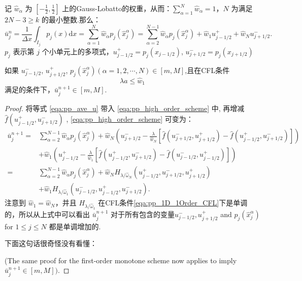 \documentclass{book}
\begin{document}
记 $\hat{w}_{\alpha}$ 为 $\left[-\frac{1}{2}, \frac{1}{2}\right]$ 上的Gauss-Lobatto的权重，从而：$\sum_{\alpha=1}^{N} \hat{w}_{\alpha}=1$，$N$ 为满足 $2 N-3 \geqslant k$ 的最小整数.那么：
\begin{equation}
    \label{eqa:pp_ave_u}
    \bar{u}_{j}^{n}=\frac{1}{\Delta x} \int_{I_{j}} p_{j}(x) \mathrm{d} x=\sum_{\alpha=1}^{N} \hat{w}_{\alpha} p_{j}\left(\hat{x}_{j}^{\alpha}\right)=\sum_{\alpha=2}^{N-1} \hat{w}_{\alpha} p_{j}\left(\hat{x}_{j}^{\alpha}\right)+\hat{w}_{1} u_{j-1 / 2}^{+}+\hat{w}_{N} u_{j+1 / 2}^{-} .
\end{equation}
$p_j$ 表示第 $j$ 个小单元上的多项式，$u_{j-1/2}^+=p_j(x_{j-1/2})$, $u_{j+1/2}^-=p_j(x_{j+1/2})$
\begin{theorem}{}{}
    如果 $u_{j-1/2}^-$, $u_{j+1/2}^+$, $p_j(\hat{x}_j^\alpha)(\alpha=1,2,\cdots,N)\in[m,M]$,且在CFL条件
    \begin{equation}
        \lambda a \leq \hat{w}_{1}
    \end{equation}
    满足的条件下，$\bar{u}_j^{n+1}\in[m,M]$.
\end{theorem}
\begin{proof}
    将等式 \eqref{eqa:pp_ave_u} 带入 \eqref{eqa:pp_high_order_scheme} 中, 再增减  $\hat{f}\left(u_{j-1 / 2}^{+}, u_{j+1 / 2}^{-}\right)$ , \eqref{eqa:pp_high_order_scheme} 可变为：
    \begin{equation}
        \begin{aligned}
            \bar{u}_{j}^{n+1}= & \sum_{\alpha=2}^{N-1} \hat{w}_{\alpha} p_{j}\left(\hat{x}_{j}^{\alpha}\right)+\hat{w}_{N}\left(u_{j+1 / 2}^{-}-\frac{\lambda}{\hat{w}_{N}}\left[\hat{f}\left(u_{j+1 / 2}^{-}, u_{j+1 / 2}^{+}\right)-\hat{f}\left(u_{j-1 / 2}^{+}, u_{j+1 / 2}^{-}\right)\right]\right) \\
                               & +\hat{w}_{1}\left(u_{j-1 / 2}^{+}-\frac{\lambda}{\hat{w}_{1}}\left[\hat{f}\left(u_{j-1 / 2}^{+}, u_{j+1 / 2}^{-}\right)-\hat{f}\left(u_{j-1 / 2}^{-}, u_{j-1 / 2}^{+}\right)\right]\right)                                                                              \\
            =                  & \sum_{\alpha=2}^{N-1} \hat{w}_{\alpha} p_{j}\left(\hat{x}_{j}^{\alpha}\right)+\hat{w}_{N} H_{\lambda / \hat{\omega}_{N}}\left(u_{j-1 / 2}^{+}, u_{j+1 / 2}^{-}, u_{j+1 / 2}^{+}\right)                                                                                  \\
                               & +\hat{w}_{1} H_{\lambda / \hat{\omega}_{1}}\left(u_{j-1 / 2}^{-}, u_{j-1 / 2}^{+}, u_{j+1 / 2}^{-}\right) .
        \end{aligned}
    \end{equation}
    注意到  $\hat{w}_{1}=\hat{w}_{N}$，并且 $H_{\lambda / \hat{\omega}_{1}}$  在CFL条件\eqref{eqa:pp_1D_1Order_CFL}下是单调的，所以从上式中可以看出 $\bar{u}_{j}^{n+1}$  对于所有包含的变量$u_{j-1 / 2}^{-}, u_{j+1 / 2}^{+}$ and  $p_{j}\left(\hat{x}_{j}^{\alpha}\right)$  for  $1 \leq j \leq N$ 都是单调增加的.

    下面这句话很奇怪没有看懂：

    (The same proof for the first-order monotone scheme now applies to imply  $\bar{u}_{j}^{n+1} \in[m, M])$.
\end{proof}
\end{document}
